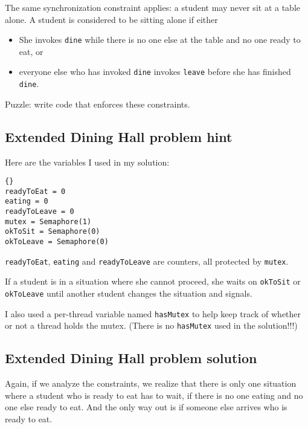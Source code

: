 \documentclass{book}
\newcommand{\clearemptydoublepage}{\newpage\cleardoublepage}
\begin{document}
The same synchronization constraint applies: a student may never sit
at a table alone.  A student is considered to be sitting alone if
either

\begin{itemize}

\item She invokes {\tt dine} while there is no one else at the table
and no one ready to eat, or

\item everyone else who has invoked {\tt dine} invokes {\tt leave}
before she has finished {\tt dine}.

\end{itemize}

Puzzle: write code that enforces these constraints.


\clearemptydoublepage
\subsection {Extended Dining Hall problem hint}

Here are the variables I used in my solution:

\begin{lstlisting}[title={Extended Dining Hall problem hint}]{}
readyToEat = 0
eating = 0
readyToLeave = 0
mutex = Semaphore(1)
okToSit = Semaphore(0)
okToLeave = Semaphore(0)
\end{lstlisting}

{\tt readyToEat}, {\tt eating} and {\tt readyToLeave} are
counters, all protected by {\tt mutex}.

If a student is in a situation where she cannot proceed, she
waits on
{\tt okToSit} or {\tt okToLeave} until another student changes
the situation and signals.

I also used a per-thread variable named {\tt hasMutex} to help
keep track of whether or not a thread holds the mutex.
(There is no {\tt hasMutex} used in the solution!!!)

\clearemptydoublepage
\subsection {Extended Dining Hall problem solution}

Again, if we analyze the constraints, we realize that there is
only one situation where a student who is ready to eat has
to wait, if there is no one eating and no one else ready to
eat.  And the only way out is if someone else arrives who
is ready to eat.
\end{document}
